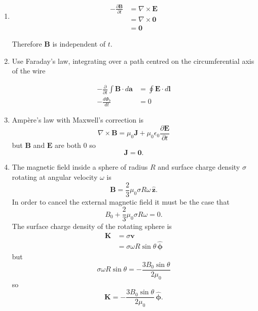 \documentclass{article}
\renewcommand{\vec}[1]{\boldsymbol{\mathbf{#1}}}
\newcommand{\uvec}[1]{\hat{\vec{#1}}}
\begin{document}
\begin{enumerate}
  \item

        \begin{align*}
          -\frac{\partial \vec{B}}{\partial t} & = \nabla \times \vec{E} \\
                                               & = \nabla \times \vec{0} \\
                                               & = \vec{0}
        \end{align*}

        Therefore $\vec{B}$ is independent of $t$.

  \item Use Faraday's law, integrating over a path centred on the circumferential axis of the wire

        \begin{align*}
          -\frac{\partial}{\partial t} \int \vec{B} \cdot d \vec{a} & = \oint \vec{E} \cdot d \vec{l} \\
          -\frac{d \Phi_b}{d t}                                     & = 0
        \end{align*}

  \item Ampère's law with Maxwell's correction is \[\nabla \times \vec{B} = \mu_0 \vec{J} + \mu_0 \epsilon_0 \frac{\partial \vec{E}}{\partial t}\] but $\vec{B}$ and $\vec{E}$ are both $0$ so \[\vec{J} = \vec{0}.\]

  \item The magnetic field inside a sphere of radius $R$ and surface charge density $\sigma$ rotating at angular velocity $\omega$ is \[\vec{B} = \frac{2}{3} \mu_0 \sigma R \omega \,\uvec{z}.\] In order to cancel the external magnetic field it must be the case that \[B_0 + \frac{2}{3} \mu_0 \sigma R \omega = 0.\] The surface charge density of the rotating sphere is \begin{align*}
          \vec{K} & = \sigma \vec{v}                            \\
                  & = \sigma \omega R \sin \theta \,\uvec{\phi}
        \end{align*} but \[\sigma \omega R \sin \theta = -\frac{3 B_0 \sin \theta}{2 \mu_0}\] so \[\vec{K} = -\frac{3 B_0 \sin \theta}{2 \mu_0} \,\uvec{\phi}.\]
\end{enumerate}

\subsection{}
\end{document}
